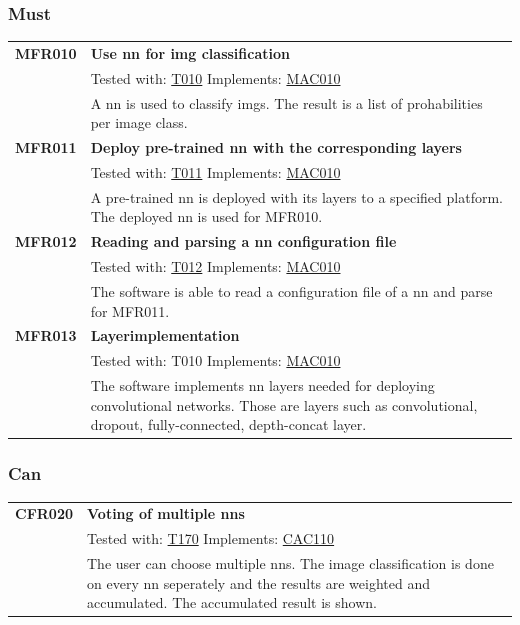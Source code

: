 \documentclass[parskip=full]{scrartcl}
\begin{document}
\subsubsection{Must}
\begin{tabular}{p{2cm}p{11.4cm}}
\textbf{MFR010}\hypertarget{MFR010} & \textbf{Use \gls{nn} for \gls{img} classification}\\
& Tested with: \hyperlink{T010}{T010} Implements: \hyperlink{MAC010}{MAC010} \\                                    
& A \gls{nn} is used to classify \glspl{img}. The result is a list of prohabilities per image class.\\
\textbf{MFR011}\hypertarget{MFR011} & \textbf{Deploy pre-trained \gls{nn} with the corresponding layers}\\
& Tested with: \hyperlink{T011}{T011} Implements: \hyperlink{MAC010}{MAC010} \\
& A pre-trained \gls{nn} is deployed with its layers to a specified platform. The deployed \gls{nn} is used for MFR010.\\
\textbf{MFR012} \hypertarget{MFR012}& \textbf{Reading and parsing a \gls{nn} configuration file}\\
& Tested with: \hyperlink{T012}{T012} Implements: \hyperlink{MAC010}{MAC010} \\
& The software is able to read a configuration file of a \gls{nn} and parse for MFR011.\\
\textbf{MFR013} & \textbf{Layerimplementation}\\
& Tested with: \hypertarget{T010}{T010} Implements: \hyperlink{MAC010}{MAC010}\\
& The software implements \gls{nn} layers needed for deploying convolutional networks. Those are layers such as convolutional, dropout, fully-connected, depth-concat layer.
\end{tabular}
\subsubsection{Can}
\begin{tabular}{p{2cm}p{11.4cm}}
\textbf{CFR020} \hypertarget{CFR170} & \textbf{Voting of multiple \glspl{nn}}\\
& Tested with: \hyperlink{T170}{T170} Implements: \hyperlink{CAC110}{CAC110} \\
& The user can choose multiple \glspl{nn}. The \gls{image classification} is done on every \gls{nn} seperately and the results are weighted and accumulated. The accumulated result is shown.\\
\end{tabular}
\end{document}
